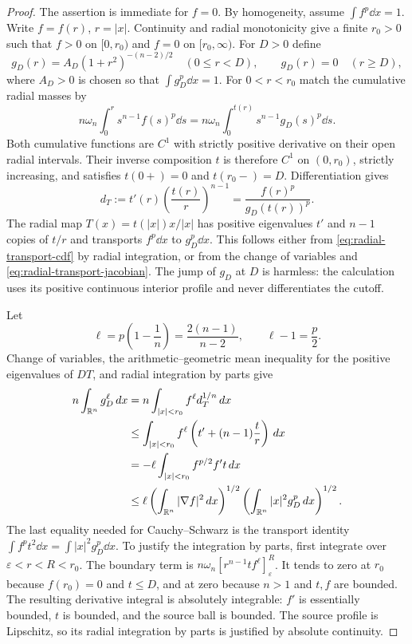 \begin{proof}
The assertion is immediate for $f=0$.  By homogeneity, assume
$\int f^p\dd x=1$.  Write $f=f(r)$, $r=|x|$.  Continuity and radial
monotonicity give a finite $r_0>0$ such that $f>0$ on $[0,r_0)$ and
$f=0$ on $[r_0,\infty)$.
For $D>0$ define
\[
 g_D(r)=A_D(1+r^2)^{-(n-2)/2}\quad(0\le r<D),
 \qquad g_D(r)=0\quad(r\ge D),
\]
where $A_D>0$ is chosen so that $\int g_D^p\dd x=1$.
For $0<r<r_0$ match the cumulative radial masses by
\begin{equation}
 n\omega_n\int_0^r s^{n-1}f(s)^p\dd s
   =n\omega_n\int_0^{t(r)}s^{n-1}g_D(s)^p\dd s.
 \label{eq:radial-transport-cdf}
\end{equation}
Both cumulative functions are $C^1$ with strictly positive derivative
on their open radial intervals.  Their inverse composition $t$ is
therefore $C^1$ on $(0,r_0)$, strictly increasing, and satisfies
$t(0+)=0$ and $t(r_0-)=D$.  Differentiation gives
\begin{equation}
 d_T:=t'(r)\left(\frac{t(r)}r\right)^{n-1}
      =\frac{f(r)^p}{g_D(t(r))^p}.
 \label{eq:radial-transport-jacobian}
\end{equation}
The radial map $T(x)=t(|x|)x/|x|$ has positive eigenvalues
$t'$ and $n-1$ copies of $t/r$ and transports $f^p\dd x$ to
$g_D^p\dd x$.  This follows either from
\eqref{eq:radial-transport-cdf} by radial integration, or from the
change of variables and \eqref{eq:radial-transport-jacobian}.
The jump of $g_D$ at $D$ is harmless: the calculation uses its
positive continuous interior profile and never differentiates the
cutoff.

Let
\[
 \ell=p\left(1-\frac1n\right)=\frac{2(n-1)}{n-2},
 \qquad \ell-1=\frac p2.
\]
Change of variables, the arithmetic--geometric mean inequality for
the positive eigenvalues of $DT$, and radial integration by parts
give
\begin{align}
 n\int_{\mathbb R^n}g_D^\ell\,d x
 &=n\int_{|x|<r_0}f^\ell d_T^{1/n}\,d x \notag\\
 &\le\int_{|x|<r_0}f^\ell
               \left(t'+(n-1)\frac tr\right)\,d x \notag\\
 &=-\ell\int_{|x|<r_0}f^{p/2}f't\,d x \notag\\
 &\le\ell\left(\int_{\mathbb R^n}|\nabla f|^2\,d x\right)^{1/2}
          \left(\int_{\mathbb R^n}|x|^2g_D^p\,d x\right)^{1/2}.
 \label{eq:radial-transport-estimate}
\end{align}
The last equality needed for Cauchy--Schwarz is the transport
identity $\int f^pt^2\dd x=\int|x|^2g_D^p\dd x$.
To justify the integration by parts, first integrate over
$\varepsilon<r<R<r_0$.  The boundary term is
$n\omega_n[r^{n-1}tf^\ell]_{\varepsilon}^R$.
It tends to zero at $r_0$ because $f(r_0)=0$ and $t\le D$, and at zero
because $n>1$ and $t,f$ are bounded.  The resulting derivative
integral is absolutely integrable: $f'$ is essentially bounded,
$t$ is bounded, and the source ball is bounded.  The source profile
is Lipschitz, so its radial integration by parts is justified by
absolute continuity.


\end{proof}
